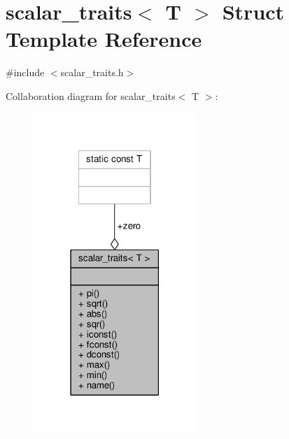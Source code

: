 \hypertarget{structscalar__traits}{\section{scalar\-\_\-traits$<$ T $>$ Struct Template Reference}
\label{structscalar__traits}
}


{\ttfamily \#include $<$scalar\-\_\-traits.\-h$>$}



Collaboration diagram for scalar\-\_\-traits$<$ T $>$\-:
\nopagebreak
\begin{figure}[H]
\begin{center}
\leavevmode
\includegraphics[width=174pt]{structscalar__traits__coll__graph}
\end{center}
\end{figure}
